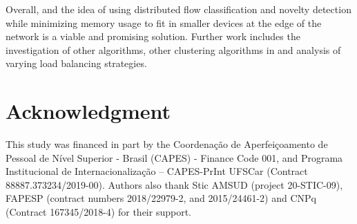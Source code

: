 Overall, \mfog and the idea of using distributed flow classification and novelty
detection while minimizing memory usage to fit in smaller devices at the edge of
the network is a viable and promising solution.
Further work includes the investigation of other \nd algorithms, other clustering
algorithms in \minas and analysis of varying load balancing strategies.



\section*{Acknowledgment}

This study was financed in part by the Coordenação de Aperfeiçoamento de Pessoal de
Nível Superior - Brasil (CAPES) - Finance Code 001,
and Programa Institucional de Internacionalização – CAPES-PrInt UFSCar (Contract 88887.373234/2019-00). 
Authors also thank Stic AMSUD (project 20-STIC-09), FAPESP (contract numbers  2018/22979-2, and 2015/24461-2) and CNPq (Contract 167345/2018-4) for their support.
